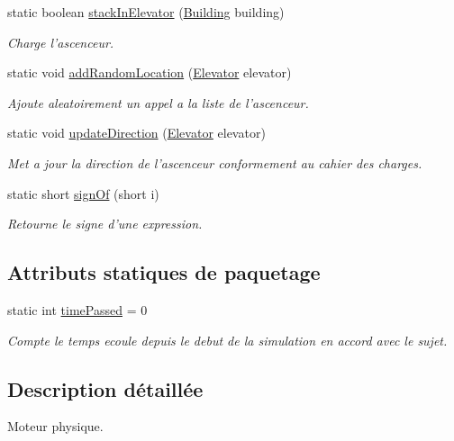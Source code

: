 \begin{DoxyCompactItemize}
static boolean \hyperlink{classElevatorProject_a7cb85c87b7466ac344bfb6f6681835ca}{stack\-In\-Elevator} (\hyperlink{classElevatorProject_1_1Building}{Building} building)
\begin{DoxyCompactList}\small\item\em Charge l'ascenceur. \end{DoxyCompactList}\item 
static void \hyperlink{classElevatorProject_a77dc39b7be58598bdeb1ea046fba80bd}{add\-Random\-Location} (\hyperlink{classElevatorProject_1_1Elevator}{Elevator} elevator)
\begin{DoxyCompactList}\small\item\em Ajoute aleatoirement un appel a la liste de l'ascenceur. \end{DoxyCompactList}\item 
static void \hyperlink{classElevatorProject_a3fa954118cf63e69d6c949723e93f19f}{update\-Direction} (\hyperlink{classElevatorProject_1_1Elevator}{Elevator} elevator)
\begin{DoxyCompactList}\small\item\em Met a jour la direction de l'ascenceur conformement au cahier des charges. \end{DoxyCompactList}\item 
static short \hyperlink{classElevatorProject_a864982da0944af7548bda913614faa57}{sign\-Of} (short i)
\begin{DoxyCompactList}\small\item\em Retourne le signe d'une expression. \end{DoxyCompactList}\end{DoxyCompactItemize}
\subsection*{Attributs statiques de paquetage}
\begin{DoxyCompactItemize}
\item 
static int \hyperlink{classElevatorProject_ab748dd5a6fb42b4c2b83d4e6ad3138ba}{time\-Passed} = 0
\begin{DoxyCompactList}\small\item\em Compte le temps ecoule depuis le debut de la simulation en accord avec le sujet. \end{DoxyCompactList}\end{DoxyCompactItemize}


\subsection{Description détaillée}
Moteur physique. 

